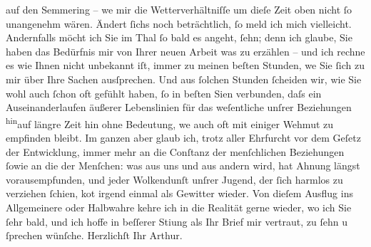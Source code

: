 \begin{ledgroupsized}[t]{13cm}
               auf den Semmering – we{\geminationn}
               mir die Wetterverhältniſſe um dieſe Zeit oben nicht ſo unangenehm wären. Ändert ſichs
               noch beträchtlich, ſo meld ich mich vielleicht. Andernfalls möcht ich Sie im Thal ſo
               bald es angeht, ſehn; denn ich glaube, {\pb}Sie haben das
               Bedürfnis mir von Ihrer neuen Arbeit was zu erzählen – und ich rechne es wie Ihnen nicht unbekannt iſt,
               immer zu meinen beſten Stunden, we{\geminationn} Sie ſich zu mir über
               Ihre Sachen ausſprechen. Und aus ſolchen Stunden ſcheiden wir, wie Sie wohl auch
               ſchon oft gefühlt haben, ſo in beſten Si{\geminationn}en verbunden,
               daſs ein Auseinanderlaufen äußerer Lebenslinien für das weſentliche unſrer
               Beziehungen \substVorne{}\textsuperscript{hin}\substDazwischen{}auf\substHinten{} längre Zeit \introOben{}hin\introOben{} ohne Bedeutung, we{\geminationn} auch oft mit einiger Wehmut zu empfinden bleibt. Im
               ganzen aber glaub ich, trotz aller Ehrfurcht vor dem Geſetz der Entwicklung, immer
               mehr an die Conſtanz der \introOben{}menſchlichen\introOben{} Beziehungen \introOben{}ſo\introOben{}wie an die der Menſchen: was aus uns und aus andern wird,
               hat Ahnung längst vorausempfunden, und jeder Wolkendunſt unſrer Jugend, der ſich
               harmlos zu verziehen ſchien, ko{\geminationm}t irgend einmal als
               Gewitter wieder. Von dieſem Ausflug ins Allgemeinere oder Halbwahre kehre ich in die
               Realität gerne wieder, wo ich Sie ſehr bald, und ich hoffe in beſſerer Sti{\geminationm}ung als Ihr Brief mir vertraut, zu ſehn u ſprechen
               wünſche.\pend
           \pstart Herzlichſt Ihr \spacefill\mbox{Arthur.}\pend{}
         
         \endnumbering{}\end{ledgroupsized}  \newcommand{\dateiname}{L02168}\newcommand{\titel}{Arthur Schnitzler an Hugo von Hofmannsthal, 28. 3. 1914}\newcommand{\editorInnen}{Martin Anton Müller und Gerd-Hermann Susen}
      